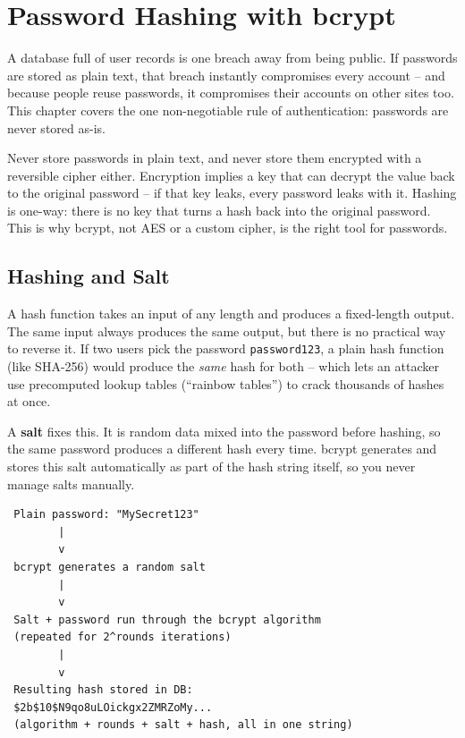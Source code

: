 \chapter{Password Hashing with bcrypt}

A database full of user records is one breach away from being public. If
passwords are stored as plain text, that breach instantly compromises every
account -- and because people reuse passwords, it compromises their accounts
on other sites too. This chapter covers the one non-negotiable rule of
authentication: passwords are never stored as-is.

\begin{warnbox}[WARNING]
Never store passwords in plain text, and never store them encrypted with a
reversible cipher either. Encryption implies a key that can decrypt the
value back to the original password -- if that key leaks, every password
leaks with it. Hashing is one-way: there is no key that turns a hash back
into the original password. This is why bcrypt, not AES or a custom cipher,
is the right tool for passwords.
\end{warnbox}

\section{Hashing and Salt}

A hash function takes an input of any length and produces a fixed-length
output. The same input always produces the same output, but there is no
practical way to reverse it. If two users pick the password
\texttt{password123}, a plain hash function (like SHA-256) would produce the
\emph{same} hash for both -- which lets an attacker use precomputed lookup
tables (``rainbow tables'') to crack thousands of hashes at once.

A \textbf{salt} fixes this. It is random data mixed into the password before
hashing, so the same password produces a different hash every time. bcrypt
generates and stores this salt automatically as part of the hash string
itself, so you never manage salts manually.

\begin{diagrambox}
\begin{verbatim}
 Plain password: "MySecret123"
        |
        v
 bcrypt generates a random salt
        |
        v
 Salt + password run through the bcrypt algorithm
 (repeated for 2^rounds iterations)
        |
        v
 Resulting hash stored in DB:
 $2b$10$N9qo8uLOickgx2ZMRZoMy...
 (algorithm + rounds + salt + hash, all in one string)
\end{verbatim}
\end{diagrambox}

